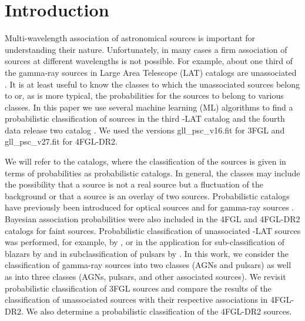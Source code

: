 \section{Introduction}

Multi-wavelength association of astronomical sources is important for understanding their nature.
Unfortunately, in many cases a firm association of sources at different wavelengths is not possible.
For example, about one third of the gamma-ray sources in \Fermi Large Area Telescope (LAT) catalogs are unassociated
\citep{2010ApJS..188..405A, 2012ApJS..199...31N, 2015ApJS..218...23A, 2020ApJS..247...33A}.
It is at least useful to know the classes to which the unassociated sources belong to or, as is more typical,
the probabilities for the sources to belong to various classes.
In this paper we use several machine learning (ML) algorithms to find a probabilistic classification of
 sources in the third \Fermi-LAT catalog \citep[3FGL,][]{2015ApJS..218...23A} and the fourth data release two catalog
\citep[4FGL-DR2,][]{2020ApJS..247...33A, 2020arXiv200511208B}. We used the versions gll\_psc\_v16.fit for 3FGL
and gll\_psc\_v27.fit for 4FGL-DR2.

We will refer to the catalogs, where the classification of the sources is given in terms of probabilities as probabilistic catalogs.
In general, the classes may include the possibility that a source is not a real source but a fluctuation of the background 
\citep{2021arXiv210311068C}
or that a source is an overlay of two sources.
Probabilistic catalogs
have previously been introduced for optical sources 
\citep[e.g.,][]{2010EAS....45..351H, 2013AJ....146....7B}
and for gamma-ray sources \citep{2017ApJ...839....4D}.
Bayesian association probabilities were also included in the 4FGL \citep{2020ApJS..247...33A} and
4FGL-DR2 \citep{2020arXiv200511208B} catalogs for faint sources.
Probabilistic classification of unassociated \Fermi-LAT sources was performed, for example, by
\cite{2012ApJ...753...83A, 2016ApJ...820....8S, 2016ApJ...825...69M, 2017A&A...602A..86L, 2020MNRAS.492.5377L, 
2020arXiv201205251F, 2021RAA....21...15Z},
or in the application for sub-classification of blazars by
\cite{2013MNRAS.428..220H, 2014ApJ...782...41D, 2016MNRAS.462.3180C, 2017MNRAS.470.1291S, 2019MNRAS.490.4770K, 2020MNRAS.493.1926K}
and in subclassification of pulsars by \cite{2012MNRAS.424.2832L, 2016ApJ...820....8S}.
In this work, we consider the classification of gamma-ray sources into two classes (AGNs and pulsars) as well as into three classes 
(AGNs, pulsars, and other associated sources).
We revisit probabilistic classification of 3FGL sources and compare the results of the classification of unassociated sources
with their respective associations in 4FGL-DR2.
We also determine a probabilistic classification of the 4FGL-DR2 sources.


